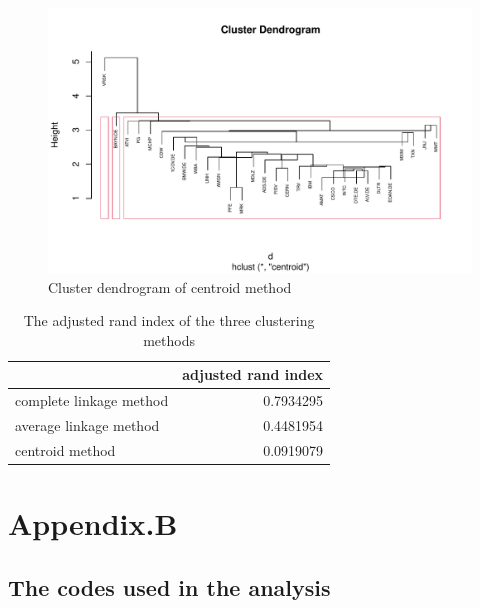 \documentclass[11pt,a4paper,]{article}
\begin{document}
\begin{figure}
\centering
\includegraphics{ass2_files/figure-latex/centroid-1.pdf}
\caption{\label{fig:centroid}Cluster dendrogram of centroid method}
\end{figure}

\begin{table}

\caption{\label{tab:adjusted-index}The adjusted rand index of the three clustering methods}
\centering
\begin{tabular}[t]{l|r}
\hline
  & adjusted rand index\\
\hline
complete linkage method & 0.7934295\\
\hline
average linkage method & 0.4481954\\
\hline
centroid method & 0.0919079\\
\hline
\end{tabular}
\end{table}

\clearpage

\hypertarget{appendix.b}{%
\section{Appendix.B}\label{appendix.b}}

\hypertarget{the-codes-used-in-the-analysis}{%
\subsection{The codes used in the analysis}\label{the-codes-used-in-the-analysis}}
\end{document}
